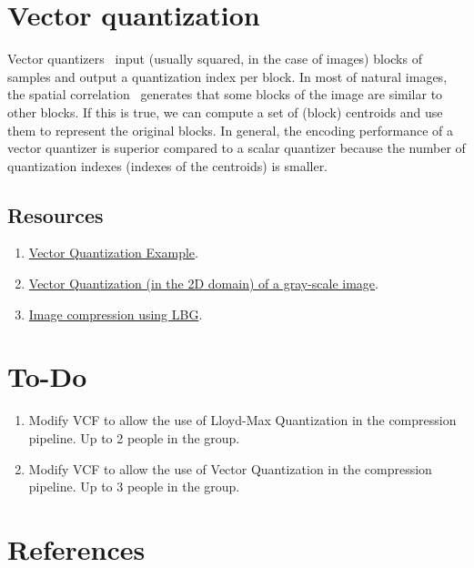 \section{Vector quantization}

Vector quantizers~\cite{vruiz__vector_quantization} input (usually
squared, in the case of images) blocks of samples and output a
quantization index per block. In most of natural images, the spatial
correlation~\cite{vruiz__visual_redundancy} generates that some blocks
of the image are similar to other blocks. If this is true, we can
compute a set of (block) centroids and use them to represent the
original blocks. In general, the encoding performance of a vector
quantizer is superior compared to a scalar quantizer because the
number of quantization indexes (indexes of the centroids) is smaller.

\subsection*{Resources}

\begin{enumerate}
\item \href{https://scikit-learn.org/stable/auto_examples/cluster/plot_face_compress.html#sphx-glr-auto-examples-cluster-plot-face-compress-py}{Vector Quantization Example}.
\item
  \href{https://github.com/Sistemas-Multimedia/Sistemas-Multimedia.github.io/blob/master/contents/gray_VQ/gray_VQ.ipynb}{Vector
    Quantization (in the 2D domain) of a gray-scale image}.
\item \href{https://github.com/vicente-gonzalez-ruiz/image_vector_quantization_LBG}{Image compression using LBG}.
\end{enumerate}

\section{To-Do}
\begin{enumerate}
\item Modify VCF to allow the use of Lloyd-Max Quantization in the
  compression pipeline. Up to 2 people in the group.
\item Modify VCF to allow the use of Vector Quantization in the
  compression pipeline. Up to 3 people in the group.
\end{enumerate}

\section{References}

\renewcommand{\addcontentsline}[3]{}%

